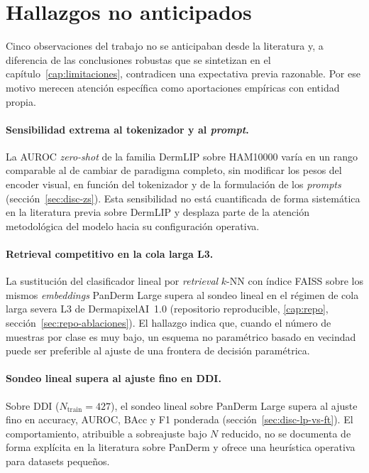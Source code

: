 \section{Hallazgos no anticipados}
\label{sec:hallazgos}

Cinco observaciones del trabajo no se anticipaban desde la literatura y,
a diferencia de las conclusiones robustas que se sintetizan en el
capítulo~\ref{cap:limitaciones}, contradicen una expectativa previa
razonable. Por ese motivo merecen atención específica como aportaciones
empíricas con entidad propia.

\paragraph{Sensibilidad extrema al tokenizador y al \emph{prompt}.}
La AUROC \emph{zero-shot} de la familia DermLIP sobre HAM10000 varía en un
rango comparable al de cambiar de paradigma completo, sin modificar los
pesos del encoder visual, en función del tokenizador y de la formulación
de los \emph{prompts} (sección~\ref{sec:disc-zs}). Esta sensibilidad no
está cuantificada de forma sistemática en la literatura previa sobre
DermLIP y desplaza parte de la atención metodológica del modelo hacia su
configuración operativa.

\paragraph{Retrieval competitivo en la cola larga L3.}
La sustitución del clasificador lineal por \emph{retrieval} $k$-NN con
índice FAISS sobre los mismos \emph{embeddings} PanDerm Large supera al
sondeo lineal en el régimen de cola larga severa L3 de DermapixelAI~1.0
(repositorio reproducible, \ref{cap:repo}, sección~\ref{sec:repo-ablaciones}). El hallazgo indica que, cuando
el número de muestras por clase es muy bajo, un esquema no paramétrico
basado en vecindad puede ser preferible al ajuste de una frontera de
decisión paramétrica.

\paragraph{Sondeo lineal supera al ajuste fino en DDI.}
Sobre DDI ($N_{\mathrm{train}} = 427$), el sondeo lineal sobre PanDerm
Large supera al ajuste fino en accuracy, AUROC, BAcc y F1 ponderada
(sección~\ref{sec:disc-lp-vs-ft}). El comportamiento, atribuible a
sobreajuste bajo $N$ reducido, no se documenta de forma explícita en la
literatura sobre PanDerm y ofrece una heurística operativa para datasets
pequeños.

